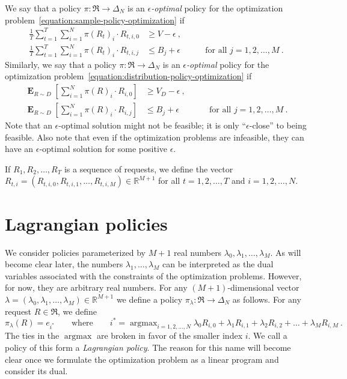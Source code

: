 \documentclass[12pt]{article}
\newcommand{\R}{\mathbb{R}}
\newcommand{\Requests}{\mathfrak{R}}
\DeclareMathOperator*{\argmax}{argmax}
\DeclareMathOperator*{\Exp}{\mathbf{E}}
\theoremstyle{definition}
\begin{document}
We say that a policy $\pi:\Requests \to \Delta_N$ is an
\emph{$\epsilon$-optimal} policy for the optimization
problem~\eqref{equation:sample-policy-optimization} if
\begin{align*}
\frac{1}{T} \sum_{t=1}^T \sum_{i=1}^N \pi(R_t)_i \cdot R_{t,i,0} & \ge V - \epsilon \: , \\
\frac{1}{T} \sum_{t=1}^T \sum_{i=1}^N \pi(R_t)_i \cdot R_{t,i,j} & \le B_j + \epsilon & \qquad \text{for all $j=1,2,\dots,M$} \: .
\end{align*}
Similarly, we say that a policy $\pi:\Requests \to \Delta_N$ is an
\emph{$\epsilon$-optimal} policy for the optimization
problem~\eqref{equation:distribution-policy-optimization} if
\begin{align*}
\Exp_{R \sim D} \left[ \sum_{i=1}^N \pi(R)_i \cdot R_{i,0} \right] & \ge V_D - \epsilon \: , \\
\Exp_{R \sim D} \left[ \sum_{i=1}^N \pi(R)_i \cdot R_{i,j} \right] & \le B_j + \epsilon & \qquad \text{for all $j=1,2,\dots,M$} \: .
\end{align*}
Note that an $\epsilon$-optimal solution might not be feasible; it is only
``$\epsilon$-close'' to being feasible. Also note that even if the optimization
problems are infeasible, they can have an $\epsilon$-optimal solution for some
positive $\epsilon$.

If $R_1, R_2, \dots, R_T$ is a sequence of requests, we define the vector
$R_{t,i} = (R_{t,i,0}, R_{t,i,1}, \dots, R_{t,i,M}) \in \R^{M+1}$ for all
$t=1,2,\dots,T$ and $i=1,2,\dots,N$.

\section{Lagrangian policies}

We consider policies parameterized by $M+1$ real numbers $\lambda_0, \lambda_1,
\dots, \lambda_M$. As will become clear later, the numbers $\lambda_1, \dots,
\lambda_M$ can be interpreted as the dual variables associated with the
constraints of the optimization problems. However, for now, they are arbitrary
real numbers. For any $(M+1)$-dimensional vector $\lambda = (\lambda_0,
\lambda_1, \dots, \lambda_M) \in \R^{M+1}$ we define a policy
$\pi_\lambda:\Requests \to \Delta_N$ as follows. For any request $R \in
\Requests$, we define
\begin{equation}
\label{equation:lagrangian-policy}
\pi_\lambda(R) = e_{i^*}
\qquad \text{where} \qquad
i^* = \argmax_{i=1,2,\dots,N} \lambda_0 R_{i,0} + \lambda_1 R_{i,1} + \lambda_2 R_{i,2} + \dots + \lambda_M R_{i,M} \: .
\end{equation}
The ties in the $\argmax$ are broken in favor of the smaller index $i$. We call
a policy of this form a \emph{Lagrangian policy}. The reason for this name will
become clear once we formulate the optimization problem as a linear program and
consider its dual.
\end{document}
